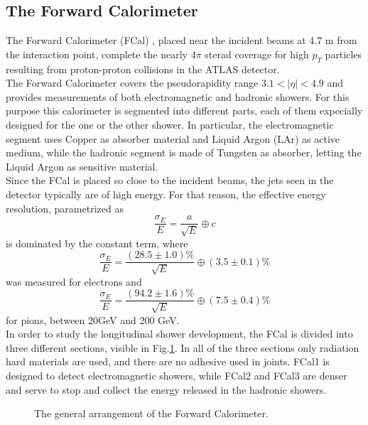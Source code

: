 \subsection{The Forward Calorimeter}
The Forward Calorimeter (FCal) \cite{Artamonov_2008}, placed near the incident beams at 4.7 m from the interaction point, complete the nearly $4\pi$ sterad coverage for high $p_T$ particles resulting from proton-proton collisions in the ATLAS detector.
\\
The Forward Calorimeter covers the pseudorapidity range $3.1 < |\eta| < 4.9$ and provides measurements of both electromagnetic and hadronic showers. For this purpose this calorimeter is segmented into different parts, each of them expecially designed for the one or the other shower. In particular, the electromagnetic segment uses Copper as absorber material and Liquid Argon (LAr) as active medium, while the hadronic segment is made of Tungsten as absorber, letting the Liquid Argon as sensitive material.
\\
Since the FCal is placed so close to the incident beams, the jets seen in the detector typically are of high energy. For that reason, the effective energy resolution, parametrized as \cite{Archambault_calibration}
\begin{equation}
\frac{\sigma_E}{E} = \frac{a}{\sqrt{E}} \oplus c
\end{equation}
is dominated by the constant term, where
\begin{equation}
\frac{\sigma_E}{E} = \frac{(28.5 \pm 1.0)\%}{\sqrt{E}} \oplus (3.5 \pm 0.1)\%
\end{equation}
was measured for electrons and
\begin{equation}
\frac{\sigma_E}{E} = \frac{(94.2 \pm 1.6)\%}{\sqrt{E}} \oplus (7.5 \pm 0.4)\%
\end{equation}
for pions, between 20GeV and 200 GeV.
\\
In order to study the longitudinal shower development, the FCal is divided into three different sections, visible in Fig.\ref{FCal}. In all of the three sections only radiation hard materials are used, and there are no adhesive used in joints. FCal1 is designed to detect electromagnetic showers, while FCal2 and FCal3 are denser and serve to stop and collect the energy released in the hadronic showers.
\begin{figure}[h]
\centering
{}
\caption{The general arrangement of the Forward Calorimeter.}
\label{FCal}
\end{figure}

